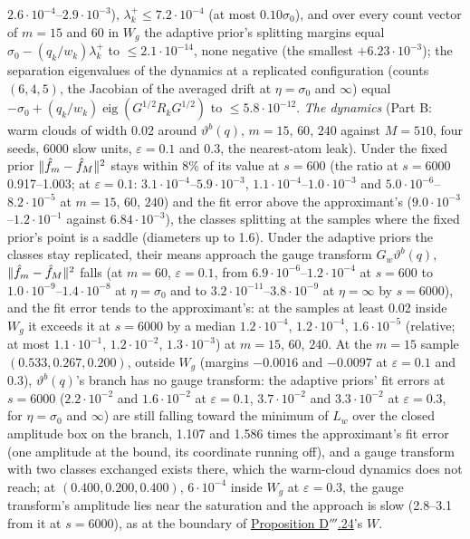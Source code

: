 $2.6\cdot10^{-4}$--$2.9\cdot10^{-3}$), $\lambda^+_k\le7.2\cdot10^{-4}$ (at most $0.10\sigma_0$), and over every count
vector of $m = 15$ and $60$ in $W_g$ the adaptive prior's splitting margins equal $\sigma_0 - (q_k/w_k)\lambda^+_k$ to
$\le2.1\cdot10^{-14}$, none negative (the smallest $+6.23\cdot10^{-3}$); the separation eigenvalues of the dynamics at
a replicated configuration (counts $(6,4,5)$, the Jacobian of the averaged drift at $\eta = \sigma_0$ and $\infty$)
equal $-\sigma_0 + (q_k/w_k)\operatorname{eig}(G^{1/2}R_kG^{1/2})$ to $\le5.8\cdot10^{-12}$. \emph{The dynamics}
(Part B: warm clouds of width 0.02 around $\vartheta^b(q)$, $m = 15$, $60$, $240$ against $M = 510$, four seeds, 6000
slow units, $\varepsilon = 0.1$ and $0.3$, the nearest-atom leak). Under the fixed prior $\lVert \hat f_m - \hat f_M\rVert^2$
stays within 8\% of its value at $s = 600$ (the ratio at $s = 6000$ 0.917--1.003; at $\varepsilon = 0.1$:
$3.1\cdot10^{-4}$--$5.9\cdot10^{-3}$, $1.1\cdot10^{-4}$--$1.0\cdot10^{-3}$ and $5.0\cdot10^{-6}$--$8.2\cdot10^{-5}$
at $m = 15$, $60$, $240$) and the fit error above the approximant's ($9.0\cdot10^{-3}$--$1.2\cdot10^{-1}$ against
$6.84\cdot10^{-3}$), the classes splitting at the samples where the fixed prior's point is a saddle (diameters up to
1.6). Under the adaptive priors the classes stay replicated, their means approach the gauge transform
$G_w\vartheta^b(q)$, $\lVert \hat f_m - \hat f_M\rVert^2$ falls (at $m = 60$, $\varepsilon = 0.1$, from
$6.9\cdot10^{-6}$--$1.2\cdot10^{-4}$ at $s = 600$ to $1.0\cdot10^{-9}$--$1.4\cdot10^{-8}$ at $\eta = \sigma_0$ and to
$3.2\cdot10^{-11}$--$3.8\cdot10^{-9}$ at $\eta = \infty$ by $s = 6000$), and the fit error tends to the approximant's:
at the samples at least 0.02 inside $W_g$ it exceeds it at $s = 6000$ by a median $1.2\cdot10^{-4}$,
$1.2\cdot10^{-4}$, $1.6\cdot10^{-5}$ (relative; at most $1.1\cdot10^{-1}$, $1.2\cdot10^{-2}$, $1.3\cdot10^{-3}$) at
$m = 15$, $60$, $240$. At the $m = 15$ sample $(0.533,0.267,0.200)$, outside $W_g$ (margins $-0.0016$ and $-0.0097$
at $\varepsilon = 0.1$ and $0.3$), $\vartheta^b(q)$'s branch has no gauge transform: the adaptive priors' fit errors
at $s = 6000$ ($2.2\cdot10^{-2}$ and $1.6\cdot10^{-2}$ at $\varepsilon = 0.1$, $3.7\cdot10^{-2}$ and
$3.3\cdot10^{-2}$ at $\varepsilon = 0.3$, for $\eta = \sigma_0$ and $\infty$) are still falling toward the minimum of
$L_w$ over the closed amplitude box on the branch, 1.107 and 1.586 times the approximant's fit error (one amplitude at
the bound, its coordinate running off), and a gauge transform with two classes exchanged exists there, which the
warm-cloud dynamics does not reach; at $(0.400,0.200,0.400)$, $6\cdot10^{-4}$ inside $W_g$ at $\varepsilon = 0.3$,
the gauge transform's amplitude lies near the saturation and the approach is slow (2.8--3.1 from it at $s = 6000$),
as at the boundary of \hyperref[res:thmDppp:24]{Proposition D$'''$.24}'s $W$.


